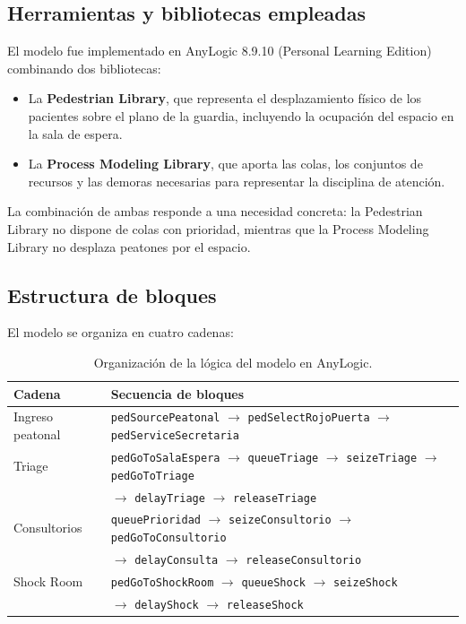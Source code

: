 \documentclass{article}
\begin{document}
\subsection{Herramientas y bibliotecas empleadas}

El modelo fue implementado en AnyLogic 8.9.10 (Personal Learning Edition)
combinando dos bibliotecas:

\begin{itemize}
  \item La \textbf{Pedestrian Library}, que representa el desplazamiento
  físico de los pacientes sobre el plano de la guardia, incluyendo la
  ocupación del espacio en la sala de espera.
  \item La \textbf{Process Modeling Library}, que aporta las colas, los
  conjuntos de recursos y las demoras necesarias para representar la
  disciplina de atención.
\end{itemize}

La combinación de ambas responde a una necesidad concreta: la Pedestrian
Library no dispone de colas con prioridad, mientras que la Process Modeling
Library no desplaza peatones por el espacio.

\subsection{Estructura de bloques}

El modelo se organiza en cuatro cadenas:

\begin{table}[H]
\centering
\small
\begin{tabular}{ll}
\toprule
\textbf{Cadena} & \textbf{Secuencia de bloques} \\
\midrule
Ingreso peatonal &
  \texttt{pedSourcePeatonal} $\rightarrow$ \texttt{pedSelectRojoPuerta}
  $\rightarrow$ \texttt{pedServiceSecretaria} \\
Triage &
  \texttt{pedGoToSalaEspera} $\rightarrow$ \texttt{queueTriage} $\rightarrow$
  \texttt{seizeTriage} $\rightarrow$ \texttt{pedGoToTriage} \\
 & $\rightarrow$ \texttt{delayTriage} $\rightarrow$ \texttt{releaseTriage} \\
Consultorios &
  \texttt{queuePrioridad} $\rightarrow$ \texttt{seizeConsultorio} $\rightarrow$
  \texttt{pedGoToConsultorio} \\
 & $\rightarrow$ \texttt{delayConsulta} $\rightarrow$ \texttt{releaseConsultorio} \\
Shock Room &
  \texttt{pedGoToShockRoom} $\rightarrow$ \texttt{queueShock} $\rightarrow$
  \texttt{seizeShock} \\
 & $\rightarrow$ \texttt{delayShock} $\rightarrow$ \texttt{releaseShock} \\
\bottomrule
\end{tabular}
\caption{Organización de la lógica del modelo en AnyLogic.}
\end{table}
\end{document}
